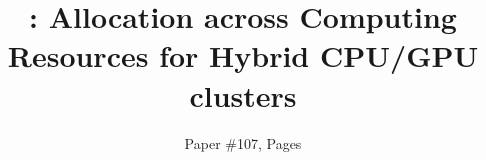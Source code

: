 \documentclass[sigconf]{acmart}
\begin{document}
	\title{\name : Allocation across Computing Resources for Hybrid CPU/GPU clusters}
	\subtitle{Paper \#107, \pageref{EndOfPaper}   Pages}
	
	
%	
%	
%	
%	
%	
%	
%	
	
	
	\begin{abstract}
	
	\end{abstract}
	
\end{document}
